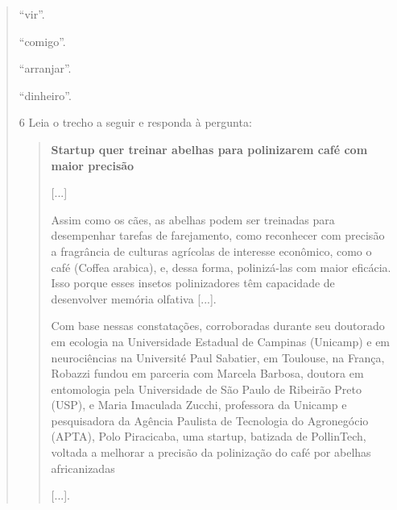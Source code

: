 \begin{quote}
\begin{escolha}
\item ``vir''.

\item ``comigo''.

\item ``arranjar''.

\item ``dinheiro''.
\end{escolha}


\num{6} Leia o trecho a seguir e responda à pergunta:

\begin{quote}
\textbf{Startup quer treinar abelhas para polinizarem café com maior precisão}

{[}...{]}

Assim como os cães, as abelhas podem ser treinadas para desempenhar
tarefas de farejamento, como reconhecer com precisão a fragrância de
culturas agrícolas de interesse econômico, como o café (Coffea arabica),
e, dessa forma, polinizá-las com maior eficácia. Isso porque esses
insetos polinizadores têm capacidade de desenvolver memória olfativa
{[}...{]}.

Com base nessas constatações, corroboradas durante seu doutorado em
ecologia na Universidade Estadual de Campinas (Unicamp) e em
neurociências na Université Paul Sabatier, em Toulouse, na França,
Robazzi fundou em parceria com Marcela Barbosa, doutora em entomologia
pela Universidade de São Paulo de Ribeirão Preto (USP), e Maria
Imaculada Zucchi, professora da Unicamp e pesquisadora da Agência
Paulista de Tecnologia do Agronegócio (APTA), Polo Piracicaba, uma
startup, batizada de PollinTech, voltada a melhorar a precisão da
polinização do café por abelhas africanizadas

{[}...{]}.

\end{quote}


\end{quote}
